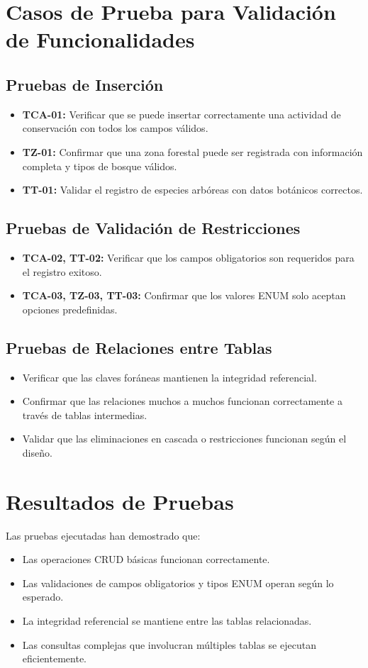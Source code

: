 \section{Casos de Prueba para Validación de Funcionalidades}

\subsection{Pruebas de Inserción}
\begin{itemize}
\item \textbf{TCA-01:} Verificar que se puede insertar correctamente una actividad de conservación con todos los campos válidos.
\item \textbf{TZ-01:} Confirmar que una zona forestal puede ser registrada con información completa y tipos de bosque válidos.
\item \textbf{TT-01:} Validar el registro de especies arbóreas con datos botánicos correctos.
\end{itemize}

\subsection{Pruebas de Validación de Restricciones}
\begin{itemize}
\item \textbf{TCA-02, TT-02:} Verificar que los campos obligatorios son requeridos para el registro exitoso.
\item \textbf{TCA-03, TZ-03, TT-03:} Confirmar que los valores ENUM solo aceptan opciones predefinidas.
\end{itemize}

\subsection{Pruebas de Relaciones entre Tablas}
\begin{itemize}
\item Verificar que las claves foráneas mantienen la integridad referencial.
\item Confirmar que las relaciones muchos a muchos funcionan correctamente a través de tablas intermedias.
\item Validar que las eliminaciones en cascada o restricciones funcionan según el diseño.
\end{itemize}

\section{Resultados de Pruebas}
Las pruebas ejecutadas han demostrado que:
\begin{itemize}
\item Las operaciones CRUD básicas funcionan correctamente.
\item Las validaciones de campos obligatorios y tipos ENUM operan según lo esperado.
\item La integridad referencial se mantiene entre las tablas relacionadas.
\item Las consultas complejas que involucran múltiples tablas se ejecutan eficientemente.
\end{itemize}

